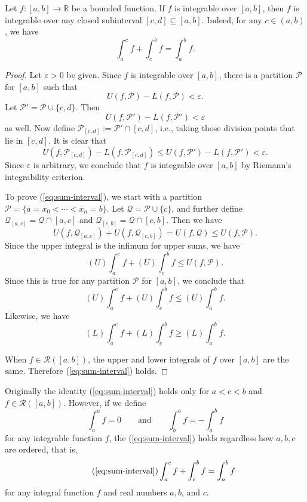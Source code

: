 \begin{thm}
  Let $f : [a,b] \to \mathbb{R}$ be a bounded function.
  If $f$ is integrable over $[a,b]$, then $f$ is integrable over any closed subinterval $[c,d] \subseteq [a,b]$.
  Indeed, for any $c \in (a,b)$, we have
  \begin{equation}
    \label{eq:sum-interval}
    \int_a^c f + \int_c^b f = \int_a^b f.
  \end{equation}
\end{thm}

\begin{proof}
  Let $\varepsilon > 0$ be given.
  Since $f$ is integrable over $[a,b]$, there is a partition $\mathcal{P}$ for $[a,b]$ such that
  \[
    U(f,\mathcal{P}) - L(f,\mathcal{P}) < \varepsilon.
  \]
  Let $\mathcal{P}' = \mathcal{P} \cup \{c, d\}$.  Then
  \[
    U(f,\mathcal{P}') - L(f,\mathcal{P}') < \varepsilon
  \]
  as well.  Now define $\mathcal{P}_{[c,d]} := \mathcal{P}' \cap [c,d]$, i.e., taking those division points that lie in $[c,d]$.
  It is clear that
  \[
    U(f,\mathcal{P}_{[c,d]}) - L(f,\mathcal{P}_{[c,d]}) \leqslant U(f,\mathcal{P}') - L(f,\mathcal{P}') < \varepsilon.
  \]
  Since $\varepsilon$ is arbitrary, we conclude that $f$ is integrable over $[a,b]$ by Riemann's integrability criterion.

  To prove (\ref{eq:sum-interval}), we start with a partition $\mathcal{P} = \{ a = x_0 < \cdots < x_n = b \}$.  Let $\mathcal{Q} = \mathcal{P} \cup \{c\}$, and further define $\mathcal{Q}_{[a,c]} = \mathcal{Q} \cap [a,c]$ and $\mathcal{Q}_{[c,b]} = \mathcal{Q} \cap [c,b]$.
  Then we have
  \[
    U(f,\mathcal{Q}_{[a,c]}) + U(f,\mathcal{Q}_{[c,b]}) = U(f,\mathcal{Q}) \leqslant U(f,\mathcal{P}).
  \]
  Since the upper integral is the infimum for upper sums, we have
  \[
    (U) \int_a^c f + (U) \int_c^b f \leqslant U(f, \mathcal{P}).
  \]
  Since this is true for any partition $\mathcal{P}$ for $[a,b]$, we conclude that
  \[
    (U) \int_a^c f + (U) \int_c^b f \leqslant (U) \int_a^b f.
  \]
  Likewise, we have
  \[
    (L) \int_a^c f + (L) \int_c^b f \geqslant (L) \int_a^b f.
  \]
  
  When $f \in \mathcal{R}([a,b])$, the upper and lower integrals of $f$ over $[a,b]$ are the same.  Therefore (\ref{eq:sum-interval}) holds.
\end{proof}

Originally the identity (\ref{eq:sum-interval}) holds only for $a < c < b$ and $f \in \mathcal{R}([a,b])$. However, if we define
\[
\int_a^a f = 0 \qquad \text{and} \qquad \int_b^a f = - \int_a^b f
\]
for any integrable function $f$, the (\ref{eq:sum-interval}) holds regardless how $a,b,c$ are ordered, that is,
\[
  \tag{\ref{eq:sum-interval}}
    \int_a^c f + \int_c^b f = \int_a^b f
\]
for any integral function $f$ and real numbers $a,b$, and $c$.

